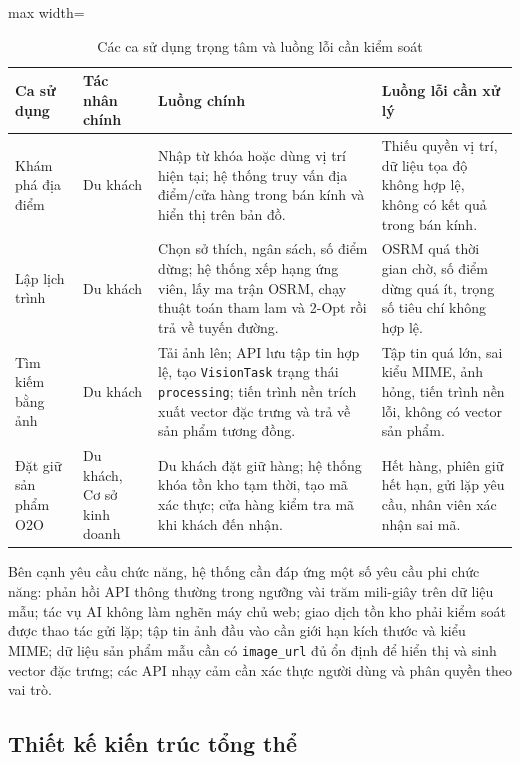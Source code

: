 \documentclass[12pt, a4paper]{article}
\begin{document}
\begin{table}[H]
\centering
\renewcommand{\arraystretch}{1.35}
\small
\begin{adjustbox}{max width=\textwidth}
\begin{tabular}{|>{\raggedright\arraybackslash}p{3.0cm}|>{\raggedright\arraybackslash}p{3.2cm}|>{\raggedright\arraybackslash}p{4.2cm}|>{\raggedright\arraybackslash}p{4.2cm}|}
\hline
\textbf{Ca sử dụng} & \textbf{Tác nhân chính} & \textbf{Luồng chính} & \textbf{Luồng lỗi cần xử lý} \\ \hline
Khám phá địa điểm & Du khách & Nhập từ khóa hoặc dùng vị trí hiện tại; hệ thống truy vấn địa điểm/cửa hàng trong bán kính và hiển thị trên bản đồ. & Thiếu quyền vị trí, dữ liệu tọa độ không hợp lệ, không có kết quả trong bán kính. \\ \hline
Lập lịch trình & Du khách & Chọn sở thích, ngân sách, số điểm dừng; hệ thống xếp hạng ứng viên, lấy ma trận OSRM, chạy thuật toán tham lam và 2-Opt rồi trả về tuyến đường. & OSRM quá thời gian chờ, số điểm dừng quá ít, trọng số tiêu chí không hợp lệ. \\ \hline
Tìm kiếm bằng ảnh & Du khách & Tải ảnh lên; API lưu tập tin hợp lệ, tạo \texttt{VisionTask} trạng thái \texttt{processing}; tiến trình nền trích xuất vector đặc trưng và trả về sản phẩm tương đồng. & Tập tin quá lớn, sai kiểu MIME, ảnh hỏng, tiến trình nền lỗi, không có vector sản phẩm. \\ \hline
Đặt giữ sản phẩm O2O & Du khách, Cơ sở kinh doanh & Du khách đặt giữ hàng; hệ thống khóa tồn kho tạm thời, tạo mã xác thực; cửa hàng kiểm tra mã khi khách đến nhận. & Hết hàng, phiên giữ hết hạn, gửi lặp yêu cầu, nhân viên xác nhận sai mã. \\ \hline
\end{tabular}
\end{adjustbox}
\caption{Các ca sử dụng trọng tâm và luồng lỗi cần kiểm soát}
\label{tab:use_cases}
\end{table}

Bên cạnh yêu cầu chức năng, hệ thống cần đáp ứng một số yêu cầu phi chức năng: phản hồi API thông thường trong ngưỡng vài trăm mili-giây trên dữ liệu mẫu; tác vụ AI không làm nghẽn máy chủ web; giao dịch tồn kho phải kiểm soát được thao tác gửi lặp; tập tin ảnh đầu vào cần giới hạn kích thước và kiểu MIME; dữ liệu sản phẩm mẫu cần có \texttt{image\_url} đủ ổn định để hiển thị và sinh vector đặc trưng; các API nhạy cảm cần xác thực người dùng và phân quyền theo vai trò.

\subsection{Thiết kế kiến trúc tổng thể}
\end{document}
